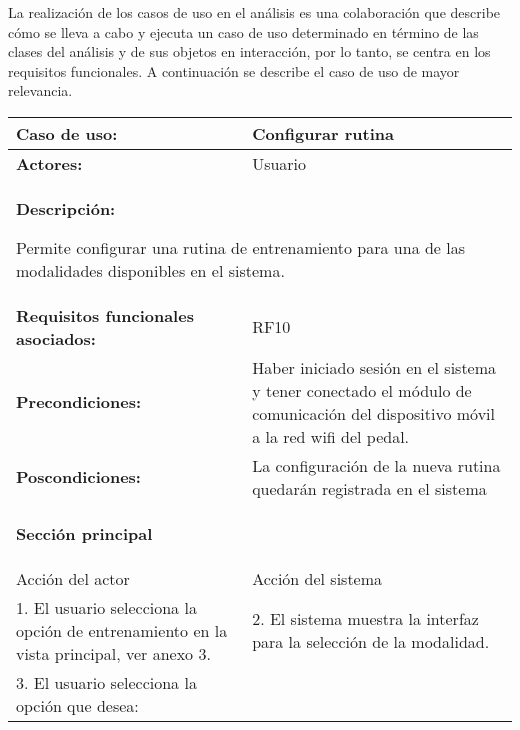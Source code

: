 La realización de los casos de uso en el análisis es una colaboración que describe cómo se lleva a cabo y ejecuta un caso de uso determinado en término de las clases del análisis y de sus objetos en interacción, por lo tanto, se centra en los requisitos funcionales. A continuación se describe el caso de uso de mayor relevancia.

\begin{table}
    \vspace*{-60pt}
    \hspace*{-48pt}
    \begin{tabularx}{1.2\textwidth}{|X|X|}
        \hline
        \textbf{Caso de uso:} & Configurar rutina \\\hline
        \textbf{Actores:}     & Usuario \\\hline
        
        \multicolumn{2}{|X|}{        
        \begin{minipage}[t]{0.950\columnwidth}
            \textbf{Descripción:}

            Permite configurar una rutina de entrenamiento para una de las modalidades disponibles en el sistema.
        \end{minipage}} \\\hline

        \textbf{Requisitos funcionales asociados:} &  RF10\\\hline
        \textbf{Precondiciones:} & Haber iniciado sesión en el sistema y tener conectado el módulo de comunicación del dispositivo móvil a la red wifi del pedal. \\\hline
        \textbf{Poscondiciones:} & La configuración de la nueva rutina quedarán registrada en el sistema \\\hline
        
        \multicolumn{2}{|X|}{        
        \begin{minipage}[t]{0.925\columnwidth}
            \begin{center}
                \textbf{Sección principal}
            \end{center}
        \end{minipage}} \\\hline
        
        Acción del actor & Acción del sistema \\\hline
        1. El usuario selecciona la opción de entrenamiento en la vista principal, ver anexo 3. & 2. El sistema muestra la interfaz para la selección de la modalidad. \\\hline
        3. El usuario selecciona la opción que desea:
        

\end{tabularx}
\end{table}
